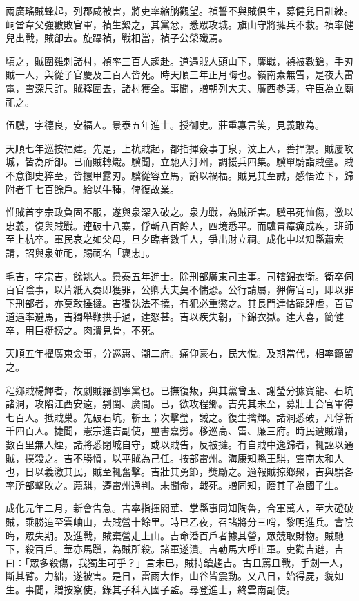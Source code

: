 \begin{pinyinscope}
兩廣瑤賊蜂起，列郡咸被害，將吏率縮朒觀望。禎誓不與賊俱生，募健兒日訓練。峒酋韋父強數敗官軍，禎生縶之，其黨忿，悉眾攻城。旗山守將擁兵不救。禎率健兒出戰，賊卻去。旋躡禎，戰相當，禎子公榮殲焉。

頃之，賊圍雞刺諸村，禎率三百人趨赴。道遇賊人頭山下，鏖戰，禎被數鎗，手刃賊一人，與從子官慶及三百人皆死。時天順三年正月晦也。嶺南素無雪，是夜大雷電，雪深尺許。賊釋圍去，諸村獲全。事聞，贈朝列大夫、廣西參議，守臣為立廟祀之。

伍驥，字德良，安福人。景泰五年進士。授御史。莊重寡言笑，見義敢為。

天順七年巡按福建。先是，上杭賊起，都指揮僉事丁泉，汶上人，善捍禦。賊屢攻城，皆為所卻。已而賊轉熾。驥聞，立馳入汀州，調援兵四集。驥單騎詣賊壘。賊不意御史猝至，皆擐甲露刃。驥從容立馬，諭以禍福。賊見其至誠，感悟泣下，歸附者千七百餘戶。給以牛種，俾復故業。

惟賊首李宗政負固不服，遂與泉深入破之。泉力戰，為賊所害。驥弔死恤傷，激以忠義，復與賊戰。連破十八寨，俘斬八百餘人，四境悉平。而驥冒瘴癘成疾，班師至上杭卒。軍民哀之如父母，旦夕臨者數千人，爭出財立祠。成化中以知縣蕭宏請，詔與泉並祀，賜祠名「褒忠」。

毛吉，字宗吉，餘姚人。景泰五年進士。除刑部廣東司主事。司轄錦衣衛。衛卒伺百官陰事，以片紙入奏即獲罪，公卿大夫莫不惴恐。公行請屬，狎侮官司，即以罪下刑部者，亦莫敢捶撻。吉獨執法不撓，有犯必重懲之。其長門達怙寵肆虐，百官道遇率避馬，吉獨舉鞭拱手過，達怒甚。吉以疾失朝，下錦衣獄。達大喜，簡健卒，用巨梃搒之。肉潰見骨，不死。

天順五年擢廣東僉事，分巡惠、潮二府。痛仰豪右，民大悅。及期當代，相率籲留之。

程鄉賊楊輝者，故劇賊羅劉寧黨也。已撫復叛，與其黨曾玉、謝瑩分據寶龍、石坑諸洞，攻陷江西安遠，剽閩、廣間。已，欲攻程鄉。吉先其未至，募壯士合官軍得七百人。抵賊巢。先破石坑，斬玉；次擊瑩，馘之。復生擒輝。諸洞悉破，凡俘斬千四百人。捷聞，憲宗進吉副使，璽書嘉勞。移巡高、雷、廉三府。時民遭賊躪，數百里無人煙，諸將悉閉城自守，或以賊告，反被撻。有自賊中逸歸者，輒誣以通賊，撲殺之。吉不勝憤，以平賊為己任。按部雷州。海康知縣王騏，雲南太和人也，日以義激其民，賊至輒奮擊。吉壯其勇節，獎勵之。適報賊掠鄉聚，吉與騏各率所部擊敗之。薦騏，遷雷州通判。未聞命，戰死。贈同知，蔭其子為國子生。

成化元年二月，新會告急。吉率指揮閻華、掌縣事同知陶魯，合軍萬人，至大磴破賊，乘勝追至雲岫山，去賊營十餘里。時已乙夜，召諸將分三哨，黎明進兵。會陰晦，眾失期。及進戰，賊棄營走上山。吉命潘百戶者據其營，眾競取財物。賊馳下，殺百戶。華亦馬躓，為賊所殺。諸軍遂潰。吉勒馬大呼止軍。吏勸吉避，吉曰：「眾多殺傷，我獨生可乎？」言未已，賊持鎗趨吉。古且罵且戰，手劍一人，斷其臂。力絀，遂被害。是日，雷雨大作，山谷皆震動。又八日，始得屍，貌如生。事聞，贈按察使，錄其子科入國子監。尋登進士，終雲南副使。


\end{pinyinscope}
